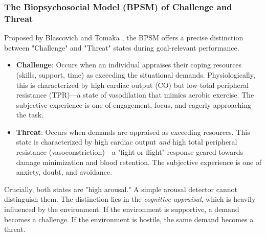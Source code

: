 \documentclass[journal]{IEEEtran}
\begin{document}
\subsubsection{The Biopsychosocial Model (BPSM) of Challenge and Threat}
Proposed by Blascovich and Tomaka \cite{biopsychosocial_model}, the BPSM offers a precise distinction between "Challenge" and "Threat" states 
during goal-relevant performance.
\begin{itemize}
    \item \textbf{Challenge}: Occurs when an individual appraises their coping resources (skills, support, time) as exceeding the situational demands. 
    Physiologically, this is characterized by high cardiac output (CO) but low total peripheral resistance (TPR)—a state of vasodilation 
    that mimics aerobic exercise. The subjective experience is one of engagement, focus, and eagerly approaching the task.
    \item \textbf{Threat}: Occurs when demands are appraised as exceeding resources. This state is characterized by high cardiac output 
    \textit{and} high total peripheral resistance (vasoconstriction)—a "fight-or-flight" response geared towards damage minimization and blood retention. 
    The subjective experience is one of anxiety, doubt, and avoidance.
\end{itemize}
Crucially, both states are "high arousal." A simple arousal detector cannot distinguish them. 
The distinction lies in the \textit{cognitive appraisal}, which is heavily influenced by the environment. 
If the environment is supportive, a demand becomes a challenge. If the environment is hostile, the same demand becomes a threat.
\end{document}

